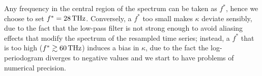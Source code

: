 Any frequency in the central region of the spectrum can be taken as $f^*$, hence we choose to set $f^*=28\,\mathrm{THz}$. Conversely, a $f^*$ too small makes $\kappa$ deviate sensibly, due to the fact that the low-pass filter is not strong enough to avoid aliasing effects that modify the spectrum of the resampled time series; instead, a $f^*$ that is too high ($f^*\gtrsim 60\,\mathrm{THz}$) induces a bias in $\kappa$, due to the fact the log-periodogram diverges to negative values and we start to have problems of numerical precision.

